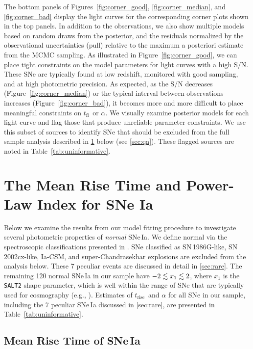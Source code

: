 \documentclass[twocolumn]{./aastex63}
\newcommand{\tfl}{$t_\mathrm{fl}$}
\newcommand{\trise}{$t_\mathrm{rise}$}
\begin{document}
The bottom panels of Figures~\ref{fig:corner_good}, \ref{fig:corner_median},
and \ref{fig:corner_bad} display the light curves for the corresponding corner
plots shown in the top panels. In addition to the observations, we also show
multiple models based on random draws from the posterior, and the residuals
normalized by the observational uncertainties (pull) relative to the maximum a
posteriori estimate from the MCMC sampling. As illustrated in
Figure~\ref{fig:corner_good}, we can place tight constraints on the model
parameters for light curves with a high S/N. These SNe are typically found at
low redshift, monitored with good sampling, and at high photometric precision.
As expected, as the S/N decreases (Figure~\ref{fig:corner_median}) or the
typical interval between observations increases (Figure~\ref{fig:corner_bad}),
it becomes more and more difficult to place meaningful constraints on \tfl\ or
$\alpha$. We visually examine posterior models for each light curve and flag
those that produce unreliable parameter constraints. We use this subset of
sources to identify SNe that should be excluded from the full sample analysis
described in \ref{sec:mean_parameters} below (see \ref{sec:qa}). These
flagged sources are noted in Table~\ref{tab:uninformative}.

\section{The Mean Rise Time and Power-Law Index for SNe
Ia}\label{sec:mean_parameters}

Below we examine the results from our model fitting procedure to investigate
several photometric properties of \textit{normal} SNe\,Ia. We define normal via
the spectroscopic classifications presented in \citet{Yao19}. SNe classified
as SN\,1986G-like, SN\,2002cx-like, Ia-CSM, and super-Chandrasekhar explosions
are excluded from the analysis below. These 7 peculiar events are discussed in
detail in \ref{sec:rare}. The remaining 120 normal SNe\,Ia in our sample
have $-2 \lesssim x_1 \lesssim 2$, where $x_1$ is the \texttt{SALT2} shape parameter,
which is well within the range of SNe that are typically used for cosmography
(e.g., \citealt{Scolnic18a}). Estimates of \trise\ and $\alpha$ for all SNe in
our sample, including the 7 peculiar SNe\,Ia discussed in \ref{sec:rare}, are
presented in Table~\ref{tab:uninformative}.

\subsection{Mean Rise Time of SNe\,Ia}\label{sec:mean_rise}
\end{document}
